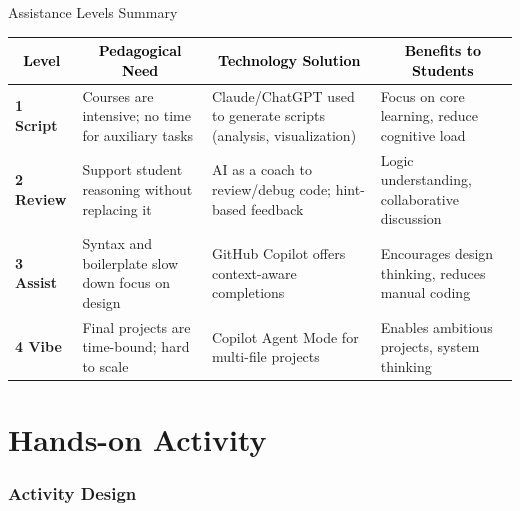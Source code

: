 \documentclass[xcolor={dvipsnames,table}, aspectratio=169]{beamer}
\newcommand{\footername}{AI in Programming Education}
\newcommand{\setfooter}[2]{\renewcommand{\footername}{\href{#2}{#1}}}
\begin{document}
\begin{frame}{Assistance Levels Summary}
  \renewcommand{\arraystretch}{1.3}
  
  \begin{table}
    \small
    \centering
    \setlength{\tabcolsep}{3pt}
    \begin{tabular}{p{1.8cm} p{4cm} p{4cm} p{4cm}}
    \multicolumn{1}{c}{\textcolor{black}{\textbf{Level}}} & 
    \multicolumn{1}{c}{\textcolor{black}{\textbf{Pedagogical Need}}} & 
    \multicolumn{1}{c}{\textcolor{black}{\textbf{Technology Solution}}} & 
    \multicolumn{1}{c}{\textcolor{black}{\textbf{Benefits to Students}}} \\
    \toprule
    
    \textbf{1 Script} & 
    Courses are intensive; no time for auxiliary tasks & 
    Claude/ChatGPT used to generate scripts (analysis, visualization) & 
    Focus on core learning, reduce cognitive load \\
    
    \textbf{2 Review} & 
    Support student reasoning without replacing it & 
    AI as a coach to review/debug code; hint-based feedback & 
    Logic understanding, collaborative discussion \\
    
    \textbf{3 Assist} & 
    Syntax and boilerplate slow down focus on design & 
    GitHub Copilot offers context-aware completions & 
    Encourages design thinking, reduces manual coding \\
    
    \textbf{4 Vibe} & 
    Final projects are time-bound; hard to scale & 
    Copilot Agent Mode for multi-file projects & 
    Enables ambitious projects, system thinking \\
    
    \bottomrule
    \end{tabular}
  \end{table}
\end{frame}


\part[Hands-on Activity]{Hands-on Activity}
\section{Activity Design}
\setfooter{Hands-on Activity}{https://github.com/neu-ece-esl/ai-prog-workshop}
\end{document}
